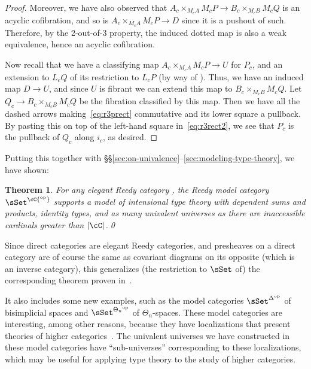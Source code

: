 \documentclass{amsart}
\newtheorem{thm}{Theorem}[section]
\theoremstyle{remark}
{\newtheorem{{rmk}}[thm]{{Remark}}}
\numberwithin{equation}{section}
\theoremstyle{plain}
\begin{document}
\begin{proof}
  Moreover, we have also observed that $A_c \times_{M_c A} M_c P\to B_c \times_{M_c B} M_c Q$ is an acyclic cofibration, and so is $A_c \times_{M_c A} M_c P\to D$ since it is a pushout of such.
  Therefore, by the 2-out-of-3 property, the induced dotted map is also a weak equivalence, hence an acyclic cofibration.

  Now recall that we have a classifying map $A_c \times_{M_c A} M_c P \to U$ for $P_c$, and an extension to $L_c Q$ of its restriction to $L_c P$ (by way of \Util).
  Thus, we have an induced map $D\to U$, and since $U$ is fibrant we can extend this map to $B_c \times_{M_c B} M_c Q$.
  Let $Q_c \to B_c \times_{M_c B} M_c Q$ be the fibration classified by this map.
  Then we have all the dashed arrows making~\eqref{eq:r3prect} commutative and its lower square a pullback.
  By pasting this on top of the left-hand square in~\eqref{eq:r3rect2}, we see that $P_c$ is the pullback of $Q_c$ along $i_c$, as desired.
\end{proof}

Putting this together with \S\S\ref{sec:on-univalence}--\ref{sec:modeling-type-theory}, we have shown:

\begin{thm}
  For any elegant Reedy category \cC, the Reedy model category $\sSet^{\cC{^{\mathrm{op}}}}$ supports a model of intensional type theory with dependent sums and products, identity types, and as many univalent universes as there are inaccessible cardinals greater than $|\cC|$.\qed
\end{thm}

Since direct categories are elegant Reedy categories, and presheaves on a direct category are of course the same as covariant diagrams on its opposite (which is an inverse category), this generalizes (the restriction to $\sSet$ of) the corresponding theorem proven in~\cite{shulman:invdia}.

It also includes some new examples, such as the model categories $\sSet^{\Delta{^{\mathrm{op}}}}$ of bisimplicial spaces and $\sSet^{\Theta_n{^{\mathrm{op}}}}$ of $\Theta_n$-spaces.
These model categories are interesting, among other reasons, because they have localizations that present theories of higher categories~\cite{rezk:css,rezk:cpncats}.
The univalent universes we have constructed in these model categories have ``sub-universes'' corresponding to these localizations, which may be useful for applying type theory to the study of higher categories.



\end{document}
